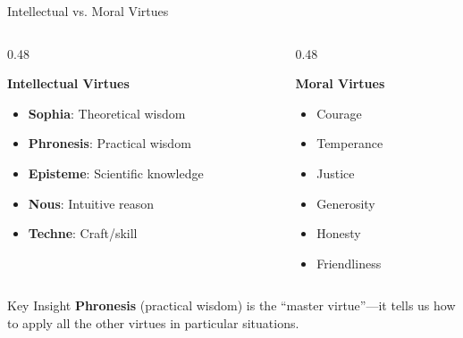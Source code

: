 ﻿\documentclass[aspectratio=169,11pt]{beamer}
\begin{document}
\begin{frame}{Intellectual vs. Moral Virtues}
\begin{columns}[T]
\begin{column}{0.48\textwidth}
\begin{block}{\textbf{Intellectual Virtues}}
\begin{itemize}
    \item \textbf{Sophia}: Theoretical wisdom
    \item \textbf{Phronesis}: Practical wisdom
    \item \textbf{Episteme}: Scientific knowledge
    \item \textbf{Nous}: Intuitive reason
    \item \textbf{Techne}: Craft/skill
\end{itemize}
\end{block}
\end{column}

\begin{column}{0.48\textwidth}
\begin{block}{\textbf{Moral Virtues}}
\begin{itemize}
    \item Courage
    \item Temperance
    \item Justice
    \item Generosity
    \item Honesty
    \item Friendliness
\end{itemize}
\end{block}
\end{column}
\end{columns}

\vspace{0.4cm}
\begin{alertblock}{Key Insight}
\textbf{Phronesis} (practical wisdom) is the ``master virtue''---it tells us how to apply all the other virtues in particular situations.
\end{alertblock}
\end{frame}
\end{document}
